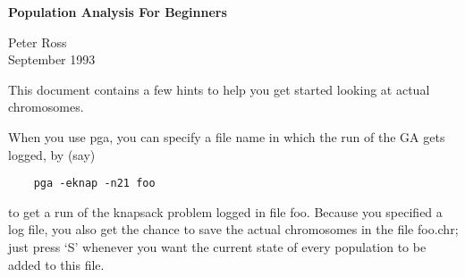 



\begin{center}
  \begin{large}
  {\bf Population Analysis For Beginners}\\[1cm]
  \end{large}
  Peter Ross\\
  September 1993
\end{center}


This document contains a few hints to help you get started looking at actual
chromosomes.

When you use pga, you can specify a file name in which the run of the
GA gets logged, by (say)
\begin{verbatim}
    pga -eknap -n21 foo
\end{verbatim}
to get a run of the knapsack problem logged in file foo. Because you
specified a log file, you also get the chance to save the actual
chromosomes in the file foo.chr; just press `S' whenever you want the
current state of every population to be added to this file.

